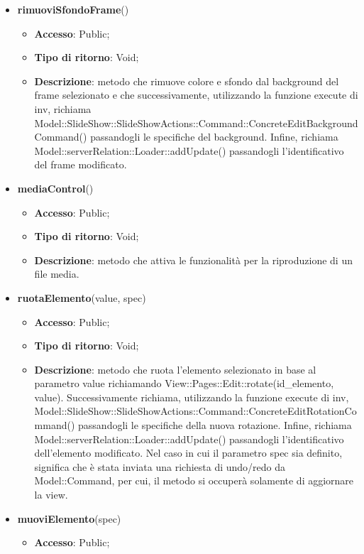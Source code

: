 {{\begin{itemize}
\begin{itemize}
		\end{itemize}
		\item \textbf{rimuoviSfondoFrame}()
		\begin{itemize}
			\item \textbf{Accesso}: Public;
			\item \textbf{Tipo di ritorno}: Void;
			\item \textbf{Descrizione}: metodo che rimuove colore e sfondo dal background del frame selezionato e che successivamente, utilizzando la funzione execute di inv, richiama Model::\-SlideShow::\-SlideShowActions::\-Command::\-ConcreteEditBackgroundCommand() passandogli le specifiche del background. Infine, richiama Model::\-serverRelation::\-Loader::\-addUpdate() passandogli l'identificativo del frame modificato.
		\end{itemize}
		\item \textbf{mediaControl}()
		\begin{itemize}
			\item \textbf{Accesso}: Public;
			\item \textbf{Tipo di ritorno}: Void;
			\item \textbf{Descrizione}: metodo che attiva le funzionalità per la riproduzione di un file media.
		\end{itemize}
		\item \textbf{ruotaElemento}(value, spec)
		\begin{itemize}
			\item \textbf{Accesso}: Public;
			\item \textbf{Tipo di ritorno}: Void;
			\item \textbf{Descrizione}: metodo che ruota l'elemento selezionato in base al parametro value richiamando View::Pages::Edit::rotate(id_elemento, value). Successivamente richiama, utilizzando la funzione execute di inv, Model::\-SlideShow::\-SlideShowActions::\-Command::\-ConcreteEditRotationCommand() passandogli le specifiche della nuova rotazione. Infine, richiama Model::\-serverRelation::\-Loader::\-addUpdate() passandogli l'identificativo dell'elemento modificato. Nel caso in cui il parametro spec sia definito, significa che è stata inviata una richiesta di undo/redo da Model::\-Command, per cui, il metodo si occuperà solamente di aggiornare la view.
		\end{itemize}
		\item \textbf{muoviElemento}(spec)
		\begin{itemize}
			\item \textbf{Accesso}: Public;

\end{itemize}
\end{itemize}}}
